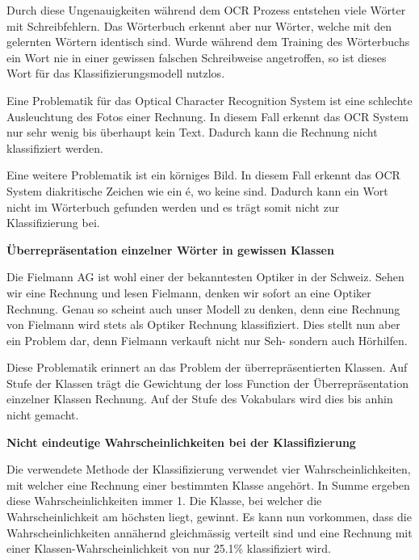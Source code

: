Durch diese Ungenauigkeiten während dem OCR Prozess entstehen viele Wörter mit Schreibfehlern. Das Wörterbuch erkennt aber nur Wörter, welche mit den gelernten Wörtern identisch sind. Wurde während dem Training des Wörterbuchs ein Wort nie in einer gewissen falschen Schreibweise angetroffen, so ist dieses Wort für das Klassifizierungsmodell nutzlos.

Eine Problematik für das Optical Character Recognition System ist eine schlechte Ausleuchtung des Fotos einer Rechnung. In diesem Fall erkennt das OCR System nur sehr wenig bis überhaupt kein Text. Dadurch kann die Rechnung nicht klassifiziert werden.

Eine weitere Problematik ist ein körniges Bild. In diesem Fall erkennt das OCR System diakritische Zeichen wie ein é, wo keine sind. Dadurch kann ein Wort nicht im Wörterbuch gefunden werden und es trägt somit nicht zur Klassifizierung bei.

\textbf{Überrepräsentation einzelner Wörter in gewissen Klassen}

Die Fielmann AG ist wohl einer der bekanntesten Optiker in der Schweiz. Sehen wir eine Rechnung und lesen Fielmann, denken wir sofort an eine Optiker Rechnung. Genau so scheint auch unser Modell zu denken, denn eine Rechnung von Fielmann wird stets als Optiker Rechnung klassifiziert. Dies stellt nun aber ein Problem dar, denn Fielmann verkauft nicht nur Seh- sondern auch Hörhilfen.

Diese Problematik erinnert an das Problem der überrepräsentierten Klassen. Auf Stufe der Klassen trägt die Gewichtung der loss Function der Überrepräsentation einzelner Klassen Rechnung. Auf der Stufe des Vokabulars wird dies bis anhin nicht gemacht.


\textbf{Nicht eindeutige Wahrscheinlichkeiten bei der Klassifizierung}

Die verwendete Methode der Klassifizierung verwendet vier Wahrscheinlichkeiten, mit welcher eine Rechnung einer bestimmten Klasse angehört. In Summe ergeben diese Wahrscheinlichkeiten immer 1. Die Klasse, bei welcher die Wahrscheinlichkeit am höchsten liegt, gewinnt. Es kann nun vorkommen, dass die Wahrscheinlichkeiten annähernd gleichmässig verteilt sind und eine Rechnung mit einer Klassen-Wahrscheinlichkeit von nur 25.1\% klassifiziert wird.

